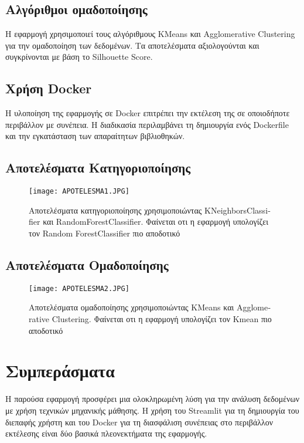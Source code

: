 \documentclass[a4paper,12pt]{article}
\begin{document}
\begin{itemize}
\subsection{Αλγόριθμοι ομαδοποίησης}
Η εφαρμογή χρησιμοποιεί τους αλγόριθμους \textlatin{KMeans} και \textlatin{Agglomerative Clustering} για την ομαδοποίηση των δεδομένων. Τα αποτελέσματα αξιολογούνται και συγκρίνονται με βάση το \textlatin{Silhouette Score}.

\subsection{Χρήση \textlatin{Docker}}
Η υλοποίηση της εφαρμογής σε \textlatin{Docker} επιτρέπει την εκτέλεση της σε οποιοδήποτε περιβάλλον με συνέπεια. Η διαδικασία περιλαμβάνει τη δημιουργία ενός \textlatin{Dockerfile} και την εγκατάσταση των απαραίτητων βιβλιοθηκών.


\subsection{Αποτελέσματα Κατηγοριοποίησης}
\begin{figure}[h!]
\centering
\texttt{[image: APOTELESMA1.JPG]}
\caption{Αποτελέσματα κατηγοριοποίησης χρησιμοποιώντας \textlatin{KNeighborsClassifier} και \textlatin{RandomForestClassifier}. Φαίνεται οτι η εφαρμογή υπολογίζει τον \textlatin{Random ForestClassifier} πιο αποδοτικό }
\end{figure}

\subsection{Αποτελέσματα Ομαδοποίησης}
\begin{figure}[h!]
\centering
\texttt{[image: APOTELESMA2.JPG]}
\caption{Αποτελέσματα ομαδοποίησης χρησιμοποιώντας \textlatin{KMeans} και \textlatin{Agglomerative Clustering}. Φαίνεται οτι η εφαρμογή υπολογίζει τον \textlatin{Kmean} πιο αποδοτικό}
\end{figure}

\section{Συμπεράσματα}
\label{sec:conclusion}
Η παρούσα εφαρμογή προσφέρει μια ολοκληρωμένη λύση για την ανάλυση δεδομένων με χρήση τεχνικών μηχανικής μάθησης. Η χρήση του \textlatin{Streamlit} για τη δημιουργία του διεπαφής χρήστη και του \textlatin{Docker} για τη διασφάλιση συνέπειας στο περιβάλλον εκτέλεσης είναι δύο βασικά πλεονεκτήματα της εφαρμογής.


\end{itemize}
\end{document}
